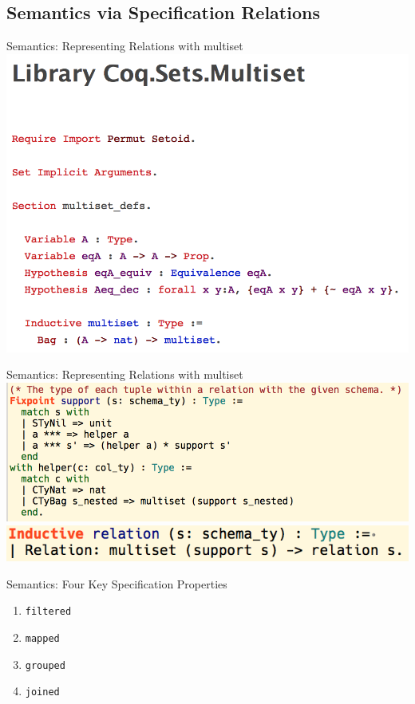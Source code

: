 \subsection{Semantics via Specification Relations}

\begin{frame}{Semantics: Representing Relations with multiset}
\centering
  \includegraphics[scale=0.5]{CoqIDE/Semantics/Multisets.png}
\end{frame}

\begin{frame}{Semantics: Representing Relations with multiset}
\centering
  \includegraphics[scale=0.55]{CoqIDE/Semantics/support.png}
	\\[3ex]
  \includegraphics[scale=0.55]{CoqIDE/Semantics/relation.png}
\end{frame}

\begin{frame}{Semantics: Four Key Specification Properties}
\centering
  \begin{enumerate}
  \item \texttt{filtered}
	\item \texttt{mapped}
	\item \texttt{grouped}
	\item \texttt{joined}
  \end{enumerate}
\end{frame}

